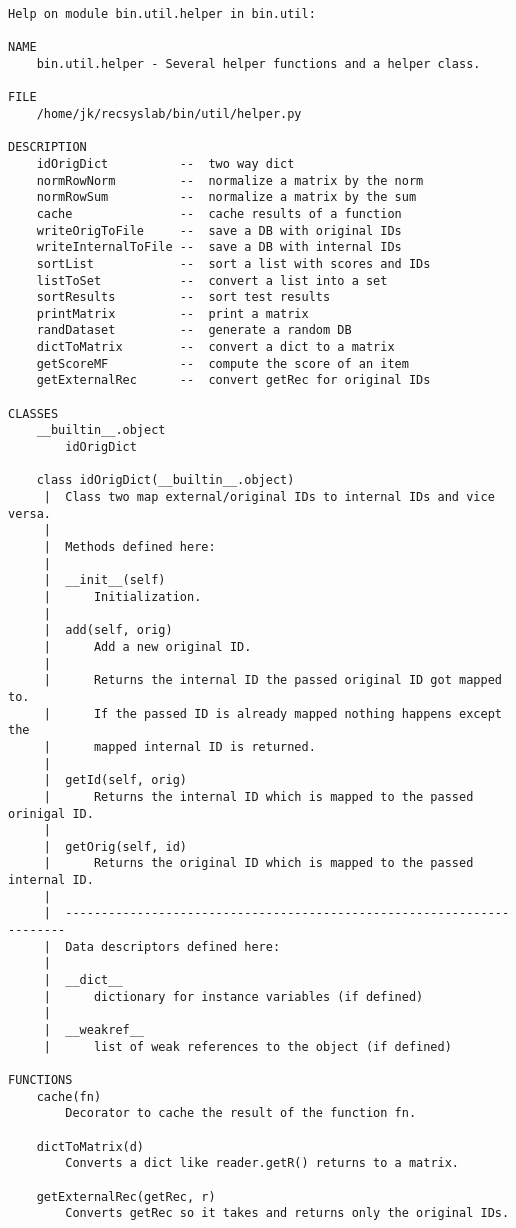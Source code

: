 \begin{lstlisting}
Help on module bin.util.helper in bin.util:

NAME
    bin.util.helper - Several helper functions and a helper class.

FILE
    /home/jk/recsyslab/bin/util/helper.py

DESCRIPTION
    idOrigDict          --  two way dict
    normRowNorm         --  normalize a matrix by the norm
    normRowSum          --  normalize a matrix by the sum
    cache               --  cache results of a function
    writeOrigToFile     --  save a DB with original IDs
    writeInternalToFile --  save a DB with internal IDs
    sortList            --  sort a list with scores and IDs
    listToSet           --  convert a list into a set
    sortResults         --  sort test results
    printMatrix         --  print a matrix
    randDataset         --  generate a random DB
    dictToMatrix        --  convert a dict to a matrix
    getScoreMF          --  compute the score of an item
    getExternalRec      --  convert getRec for original IDs

CLASSES
    __builtin__.object
        idOrigDict
    
    class idOrigDict(__builtin__.object)
     |  Class two map external/original IDs to internal IDs and vice versa.
     |  
     |  Methods defined here:
     |  
     |  __init__(self)
     |      Initialization.
     |  
     |  add(self, orig)
     |      Add a new original ID.
     |      
     |      Returns the internal ID the passed original ID got mapped to.
     |      If the passed ID is already mapped nothing happens except the
     |      mapped internal ID is returned.
     |  
     |  getId(self, orig)
     |      Returns the internal ID which is mapped to the passed orinigal ID.
     |  
     |  getOrig(self, id)
     |      Returns the original ID which is mapped to the passed internal ID.
     |  
     |  ----------------------------------------------------------------------
     |  Data descriptors defined here:
     |  
     |  __dict__
     |      dictionary for instance variables (if defined)
     |  
     |  __weakref__
     |      list of weak references to the object (if defined)

FUNCTIONS
    cache(fn)
        Decorator to cache the result of the function fn.
    
    dictToMatrix(d)
        Converts a dict like reader.getR() returns to a matrix.
    
    getExternalRec(getRec, r)
        Converts getRec so it takes and returns only the original IDs.
        

\end{lstlisting}
